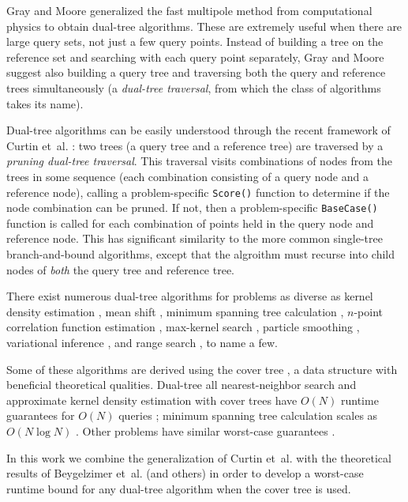 \documentclass{article} %
\begin{document}
Gray and Moore \cite{nbody} generalized the fast multipole method from
computational physics to obtain dual-tree algorithms.  These are extremely
useful when there are large query sets, not just a few query points.  Instead of
building a tree on the reference set and searching with each query point
separately, Gray and Moore suggest also building a query tree and traversing
both the query and reference trees simultaneously (a {\it dual-tree traversal},
from which the class of algorithms takes its name).

Dual-tree algorithms can be easily understood through the recent framework of
Curtin et~al. \cite{curtin2013tree}: two trees (a query tree and a reference
tree) are traversed by a {\it pruning dual-tree traversal}.  This traversal
visits combinations of nodes from the trees in some sequence (each combination
consisting of a query node and a reference node), calling a problem-specific
\texttt{Score()} function to determine if the node combination can be pruned.
If not, then a problem-specific \texttt{BaseCase()} function is called for each
combination of points held in the query node and reference node.  This has
significant similarity to the more common single-tree branch-and-bound
algorithms, except that the algroithm must recurse into child nodes of {\it
both} the query tree and reference tree.

There exist numerous dual-tree algorithms for problems as diverse as kernel
density estimation \cite{gray2003nonparametric}, mean shift \cite{wang2007fast},
minimum spanning tree calculation \cite{march2010euclidean}, $n$-point
correlation function estimation \cite{march2012fast}, max-kernel search
\cite{curtin2013fast}, particle smoothing \cite{klaas2006fast}, variational
inference \cite{amizadeh2012variational}, and range search \cite{nbody}, to name
a few.

Some of these algorithms are derived using the cover tree \cite{langford2006}, a
data structure with beneficial theoretical qualities.  Dual-tree all
nearest-neighbor search and approximate kernel density estimation with cover
trees have $O(N)$ runtime guarantees for $O(N)$ queries \cite{ram2009}; minimum
spanning tree calculation scales as $O(N \log N)$ \cite{march2010euclidean}.
Other problems have similar worst-case guarantees \cite{curtin2014dual,
march2013multi}.

In this work we combine the generalization of Curtin et~al.
\cite{curtin2013tree} with the theoretical results of Beygelzimer et~al.
\cite{langford2006} (and others) in order to develop a worst-case runtime bound
for any dual-tree algorithm when the cover tree is used.
\end{document}
